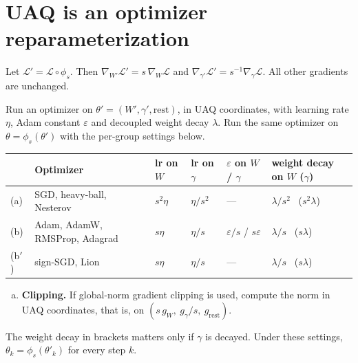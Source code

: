 \section{UAQ is an optimizer reparameterization}\label{sec:reparam}

\begin{lemma}[Gradients]\label{lem:gradients}
Let $\mathcal L'=\mathcal L\circ\phi_s$. Then $\nabla_{W'}\mathcal L'=s\,\nabla_W\mathcal L$ and $\nabla_{\gamma'}\mathcal L'=s^{-1}\nabla_\gamma\mathcal L$. All other gradients are unchanged.
\end{lemma}

\begin{theorem}[Reparameterization]\label{thm:reparam}
Run an optimizer on $\theta'=(W',\gamma',\mathrm{rest})$, in UAQ coordinates, with learning rate $\eta$, Adam constant $\varepsilon$ and decoupled weight decay $\lambda$. Run the same optimizer on $\theta=\phi_s(\theta')$ with the per-group settings below.
\begin{center}\small
\begin{tabularx}{\linewidth}{@{}l L l l l l@{}}
\toprule
& Optimizer & lr on $W$ & lr on $\gamma$ & $\varepsilon$ on $W$ / $\gamma$ & weight decay on $W$ ($\gamma$)\\
\midrule
(a) & SGD, heavy-ball, Nesterov & $s^2\eta$ & $\eta/s^2$ & --- & $\lambda/s^2$ \ ($s^2\lambda$)\\
(b) & Adam, AdamW, RMSProp, Adagrad & $s\eta$ & $\eta/s$ & $\varepsilon/s$ / $s\varepsilon$ & $\lambda/s$ \ ($s\lambda$)\\
(b$'$) & sign-SGD, Lion & $s\eta$ & $\eta/s$ & --- & $\lambda/s$ \ ($s\lambda$)\\
\bottomrule
\end{tabularx}
\end{center}
\begin{enumerate}[(c),leftmargin=*,itemsep=1pt]
\item \textbf{Clipping.} If global-norm gradient clipping is used, compute the norm in UAQ coordinates, that is, on $(s\,g_W,\ g_\gamma/s,\ g_{\mathrm{rest}})$.
\end{enumerate}
The weight decay in brackets matters only if $\gamma$ is decayed. Under these settings, $\theta_k=\phi_s(\theta'_k)$ for every step $k$.
\end{theorem}

